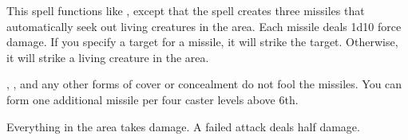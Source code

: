 \spellrng{\rngmed}
\spelleffect This spell functions like , except that the spell creates three missiles that automatically seek out living creatures in the area. Each missile deals 1d10 force damage. If you specify a target for a missile, it will strike the target. Otherwise, it will strike a living creature in the area.

, , and any other forms of cover or concealment do not fool the missiles. You can form one additional missile per four caster levels above 6th.

\spelleffect Everything in the area takes damage. A failed attack deals half damage.
\spellnotes \destructivespellnotes
{}

